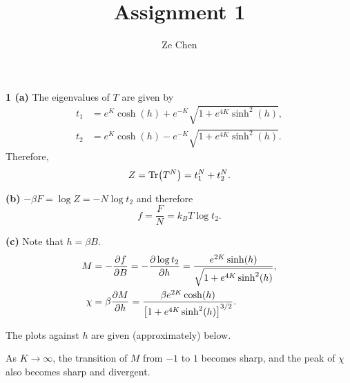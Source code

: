 \documentclass{article}
\title{Assignment 1}
\author{Ze Chen}
\makeatletter
\newcommand*{\shifttext}[1]{%
  \settowidth{\@tempdima}{#1}%
  \hspace{-\@tempdima}#1%
}
\newcommand{\plabel}[1]{%
\shifttext{\textbf{#1}\quad}%
}
\makeatother
\begin{document}
\maketitle

\plabel{1 (a)}%
The eigenvalues of $T$ are given by
\begin{align*}
    t_1 &= e^{K } \cosh (h) + e^{-K}\sqrt{1+e^{4K}\sinh^2(h)}, \\
    t_2 &= e^{K } \cosh (h) - e^{-K}\sqrt{1+e^{4K}\sinh^2(h)}.
\end{align*}
Therefore,
\[ Z = \Tr(T^N) = t_1^N + t_2^N. \]

\plabel{(b)}%
$-\beta F = \log Z = -N \log t_2$ and therefore
\[ f = \frac{F}{N} = k_B T \log t_2. \]

\plabel{(c)}%
Note that $h = \beta B$.
\begin{align*}
    M &= -\pdv{f}{B} = -\pdv{\log t_2}{h} = \frac{e^{2K} \sinh (h)}{\sqrt{1+e^{4K}\sinh^2(h)}}, \\
    \chi &= \beta \pdv{M}{h} = \frac{\beta e^{2K } \cosh (h)}{\qty[1+e^{4K}\sinh^2(h) ]^{3/2}}.
\end{align*}

The plots against $h$ are given (approximately) below.

\begin{center}
\end{center}

\begin{center}
\end{center}

As $K\rightarrow \infty$, the transition of $M$ from $-1$ to $1$ becomes sharp, and the peak of $\chi$ also becomes sharp and divergent.
\end{document}
